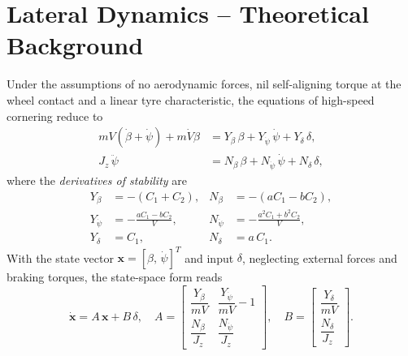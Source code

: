\section{Lateral Dynamics -- Theoretical Background}
\label{sec:theory}
Under the assumptions of no aerodynamic forces, nil self-aligning
torque at the wheel contact and a linear tyre characteristic, the
equations of high-speed cornering reduce to
\begin{align}
    mV(\dot\beta + \dot\psi) + m\dot V\beta &=
        Y_\beta\,\beta + Y_{\dot\psi}\,\dot\psi + Y_\delta\,\delta,
        \label{eq:lat_y}\\
    J_z\,\ddot\psi &=
        N_\beta\,\beta + N_{\dot\psi}\,\dot\psi + N_\delta\,\delta,
        \label{eq:lat_n}
\end{align}
where the \emph{derivatives of stability} are
\begin{equation}
\begin{aligned}
    Y_\beta      &= -(C_1 + C_2),                     &
    N_\beta      &= -(a C_1 - b C_2), \\
    Y_{\dot\psi} &= -\tfrac{a C_1 - b C_2}{V},        &
    N_{\dot\psi} &= -\tfrac{a^2 C_1 + b^2 C_2}{V}, \\
    Y_\delta     &= C_1,                              &
    N_\delta     &= a\,C_1 .
\end{aligned}
\label{eq:derivatives}
\end{equation}
With the state vector $\mathbf{x} = [\beta,\,\dot\psi]^T$ and input
$\delta$, neglecting external forces and braking torques, the
state-space form reads
\begin{equation}
    \dot{\mathbf{x}} = A\,\mathbf{x} + B\,\delta, \quad
    A =
    \begin{bmatrix}
        \dfrac{Y_\beta}{mV} & \dfrac{Y_{\dot\psi}}{mV} - 1 \\[6pt]
        \dfrac{N_\beta}{J_z} & \dfrac{N_{\dot\psi}}{J_z}
    \end{bmatrix},
    \quad
    B =
    \begin{bmatrix}
        \dfrac{Y_\delta}{mV} \\[6pt] \dfrac{N_\delta}{J_z}
    \end{bmatrix}.
    \label{eq:ss}
\end{equation}

